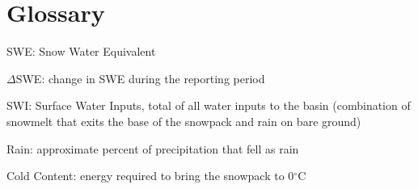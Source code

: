 \documentclass[11pt, oneside]{article}
\begin{document}
\clearpage



\clearpage


\clearpage


\clearpage
\begin{centering}

\end{centering}
\clearpage




\clearpage
\section*{Glossary}

\begin{itemize}
	\setlength\itemsep{0.05em}
	\footnotesize{
		\item[] SWE: Snow Water Equivalent
		\item[] $\Delta$SWE: change in SWE during the reporting period
		\item[] SWI: Surface Water Inputs, total of all water inputs to the basin (combination of snowmelt that exits the base of the snowpack and rain on bare ground)
		\item[] Rain: approximate percent of precipitation that fell as rain
		\item[] Cold Content: energy required to bring the snowpack to 0$^{\circ}$C
	}
\end{itemize}

\vspace{1cm}

\end{document}
